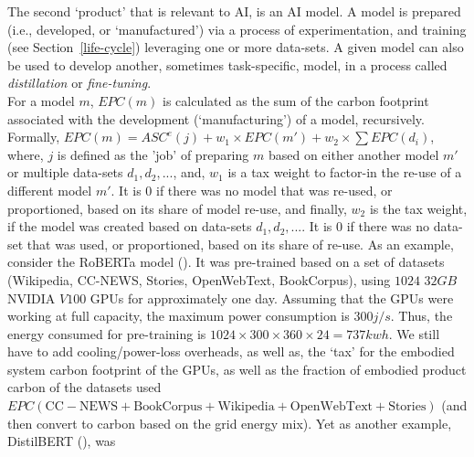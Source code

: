 The second `product' that is relevant to AI, is an AI model. A model is prepared (i.e., developed, or `manufactured') via
a process of experimentation, and training (see Section~\ref{life-cycle})
leveraging one or more data-sets.
A given model 
can also be used to develop another, sometimes task-specific, model, in a process called {\em distillation} or {\em fine-tuning}. 
\\
For a model $m$, $EPC(m)$ is calculated as the sum of the carbon footprint associated with the development (`manufacturing') of a model, recursively. Formally, 
$EPC(m) = ASC^e(j) + w_1 \times EPC(m') + w_2 \times \sum EPC(d_i)$, where, 
$j$ is defined as the 'job' of preparing $m$ based on either another model $m'$ or multiple data-sets 
$d_1, d_2, ...$, and,  
$w_1$ is a tax weight to factor-in the re-use of a different model $m'$. It is $0$ if there was no model that was re-used, or proportioned, based on its share of model re-use, and finally, $w_2$ is the tax weight, if the model was created based on data-sets $d_1, d_2,...$. It is $0$ if there was no data-set that was used, or proportioned, based on its share of re-use. As an example, consider the RoBERTa model (\cite{liu2019roberta}). It was pre-trained based on a set of datasets (Wikipedia, CC-NEWS, Stories, OpenWebText, BookCorpus), using $1024$ $32GB$ NVIDIA $V100$ GPUs for approximately one day. 
Assuming that the GPUs were working at full capacity, the maximum power consumption is $300j/s$. Thus, the energy consumed for pre-training is $1024\times 300 \times 360 \times 24 = 737 kwh$. We still have to add cooling/power-loss overheads, as well as, the `tax' for the embodied system carbon footprint of the GPUs, as well as the fraction of embodied product carbon of the datasets used $EPC(\text{CC}-\text{NEWS}+\text{BookCorpus}+\text{Wikipedia}+\text{OpenWebText}+\text{Stories})$ (and then convert to carbon based on the grid energy mix). 
Yet as another example, DistilBERT (\cite{distillbert}), was
